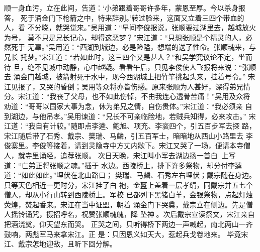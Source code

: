 顺一身血污，立在此间，告道：‘小弟跟着哥哥许多年，蒙恩至厚。今以杀身报答，
死于涌金门下枪箭之中，特来辞别。’转过脸来，这面又立着三四个带血的人，看
不分晓，就哭觉来。”吴用道：“早间李俊报说，张顺要过湖里去，越城放火为号，
莫不只是兄长记心，却得这恶梦？”宋江道：“只想张顺是个精灵的人，必然死于
无辜。”吴用道：“西湖到城边，必是险隘，想端的送了性命。张顺魂来，与兄长
托梦。”宋江道：“若如此时，这三四个又是甚人？”和吴学究议论不定，坐而待
旦，绝不见城中动静，心中越疑。看看午后，只见李俊使人飞报将来说：“张顺去
涌金门越城，被箭射死于水中，现今西湖城上把竹竿挑起头来，挂着号令。”
宋江见报了，又哭的昏倒；吴用等众将亦皆伤感。原来张顺为人甚好，深得弟兄情
分。宋江道：“我丧了父母，也不如此伤悼，不由我连心透骨苦痛！”吴用及众将
劝道：“哥哥以国家大事为念，休为弟兄之情，自伤贵体。”宋江道：“我必须亲
自到湖边，与他吊孝。”吴用谏道：“兄长不可亲临险地，若贼兵知得，必来攻击。”
宋江道：“我自有计较。”随即点李逵、鲍旭、项充、李衮四个，引五百步军去探
路，宋江随后带了石秀、戴宗、樊瑞、马麟，引五百军士，暗暗地从西山小路里去
李俊寨里。李俊等接着，请到灵隐寺中方丈内歇下。宋江又哭了一场，便请本寺僧
人，就寺里诵经，追荐张顺。
次日天晚，宋江叫小军去湖边扬一首白，上写道：“亡弟正将张顺之魂。”插于
水边。西陵桥上，排下许多祭物，却分付李逵道：“如此如此。”埋伏在北山路口；
樊瑞、马麟、石秀左右埋伏；戴宗随在身边。只等天色相近一更时分，宋江挂了白
袍，金盔上盖着一层孝绢，同戴宗并五七个僧人，却从小行山转到西陵桥上。军校
已都列下黑猪白羊，金银祭物，点起灯烛荧煌，焚起香来。宋江在当中证盟，朝着
涌金门下哭奠，戴宗立在侧边。先是僧人摇铃诵咒，摄招呼名，祝赞张顺魂魄，降
坠神。次后戴宗宣读祭文，宋江亲自把酒浇奠，仰天望东而哭。
正哭之间，只听得桥下两边一声喊起，南北两山一齐鼓响，两彪军马来拿宋江。正
是：只因恩义如天大，惹起兵戈卷地来。
毕竟宋江、戴宗怎地迎敌，且听下回分解。